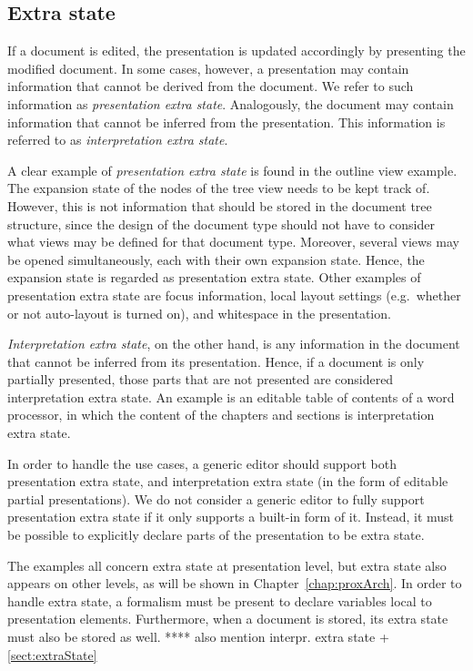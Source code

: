 \documentclass{entcs}
\begin{document}
%																
\subsection{Extra state} \label{sect:editingExtraState}

If a document is edited, the presentation is updated accordingly by presenting the modified document. In some cases, however, a presentation may contain information that cannot be derived from the document. We refer to such information as {\em presentation extra state}. Analogously, the document may contain information that cannot be inferred from the presentation. This information is referred to as {\em interpretation extra state}. 

A clear example of {\em presentation extra state} is found in the outline view example. The expansion state of the nodes of the tree view needs to be kept track of. However, this is not information that should be stored in the document tree structure, since the design of the document type should not have to consider what views may be defined for that document type. Moreover, several views may be opened simultaneously, each with their own expansion state. Hence, the expansion state is regarded as presentation extra state. Other examples of presentation extra state are focus information, local layout settings (e.g.\ whether or not auto-layout is turned on), and whitespace in the presentation. 

{\em Interpretation extra state}, on the other hand, is any information in the document that cannot be inferred from its presentation. Hence, if a document is only partially presented, those parts that are not presented are considered interpretation extra state. An example is an editable table of contents of a word processor, in which the content of the chapters and sections is interpretation extra state.

In order to handle the use cases, a generic editor should support both presentation extra state, and interpretation extra state (in the form of editable partial presentations). We do not consider a generic editor to fully support presentation extra state if it only supports a built-in form of it. Instead, it must be possible to explicitly declare parts of the presentation to be extra state.

\bc
The examples all concern extra state at presentation level, but extra state also appears on other levels, as will be shown in Chapter~\ref{chap:proxArch}. In order to handle extra state, a formalism must be present to declare variables local to presentation elements. Furthermore, when a document is stored, its extra state must also be stored as well. **** also mention interpr. extra state + \ref{sect:extraState}
\ec
\end{document}
